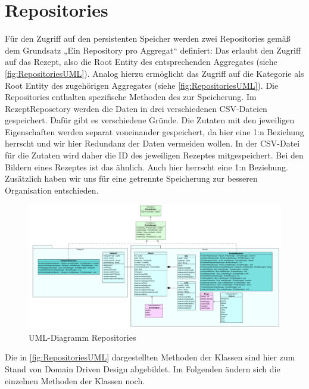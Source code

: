 \section{Repositories}
Für den Zugriff auf den persistenten Speicher werden zwei Repositories gemäß dem Grundsatz „Ein Repository pro Aggregat“ definiert: Das \href{https://github.com/MichaelaHaag/RezeptApp/tree/main/3-Domain-Code/src/main/java/de/rezeptapp/domain/Rezept/RezeptRepository.java}{} erlaubt den Zugriff auf das Rezept, also die Root Entity des entsprechenden Aggregates (siehe \autoref{fig:RepositoriesUML}). Analog hierzu ermöglicht das \href{https://github.com/MichaelaHaag/RezeptApp/blob/main/3-Domain-Code/src/main/java/de/rezeptapp/domain/Kategorie/KategorieRepository.java}{} Zugriff auf die Kategorie als Root Entity des zugehörigen Aggregates (siehe \autoref{fig:RepositoriesUML}). Die Repositories enthalten spezifische Methoden des  zur Speicherung. Im RezeptReposetory werden die Daten in drei verschiedenen CSV-Dateien gespeichert. Dafür gibt es verschiedene Gründe. Die Zutaten mit den jeweiligen Eigenschaften werden separat voneinander gespeichert, da hier eine 1:n Beziehung herrscht und wir hier Redundanz der Daten vermeiden wollen. In der CSV-Datei für die Zutaten wird daher die ID des jeweiligen Rezeptes mitgespeichert. Bei den Bildern eines Rezeptes ist das ähnlich. Auch hier herrscht eine 1:n Beziehung. Zusätzlich haben wir uns für eine getrennte Speicherung zur besseren Organisation entschieden. 

\begin{figure}[ht]
	\centering
	\includegraphics[width=1.0\textwidth]{Bilder/Reposetory-UML.png} 
	\caption{UML-Diagramm Repositories}
	\label{fig:RepositoriesUML}
\end{figure}
Die in \autoref{fig:RepositoriesUML} dargestellten Methoden der Klassen sind hier zum Stand von Domain Driven Design abgebildet. Im Folgenden ändern sich die einzelnen Methoden der Klassen noch.  

